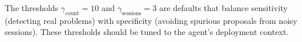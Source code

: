 The thresholds $\gamma_{\text{count}} = 10$ and $\gamma_{\text{sessions}} = 3$
are defaults that balance sensitivity (detecting real problems) with specificity
(avoiding spurious proposals from noisy sessions). These thresholds should be
tuned to the agent's deployment context.

